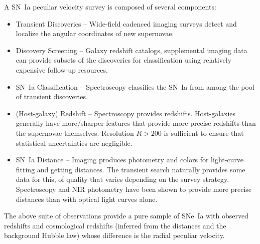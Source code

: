 %




A SN~Ia peculiar velocity survey is composed of several components:
\begin{itemize}
\item Transient Discoveries -- Wide-field cadenced imaging surveys detect and localize the angular coordinates of new supernovae.
\item Discovery Screening -- Galaxy redshift catalogs, supplemental imaging data can provide subsets of the discoveries for classification
using relatively expensive follow-up resources.
\item SN~Ia Classification -- Spectroscopy classifies the SN~Ia from among the pool of  transient discoveries. 
\item (Host-galaxy) Redshift -- Spectroscopy provides redshifts. 
Host-galaxies generally have more/sharper features that provide more precise redshifts than the supernovae themselves. Resolution $R>200$
is sufficient to ensure that statistical uncertainties are negligible.
\item SN~Ia Distance -- Imaging produces photometry and colors for light-curve fitting and getting distances.  The transient search naturally provides some data
for this, of quality that varies depending on the survey strategy.
Spectroscopy and NIR photometry
have been shown to provide more precise distances than with optical light curves alone.
\end{itemize}
The above suite of observations provide a pure sample of SNe~Ia with observed redshifts and cosmological redshifts (inferred from the distances and
the background Hubble law)
whose difference is the radial peculiar velocity.

